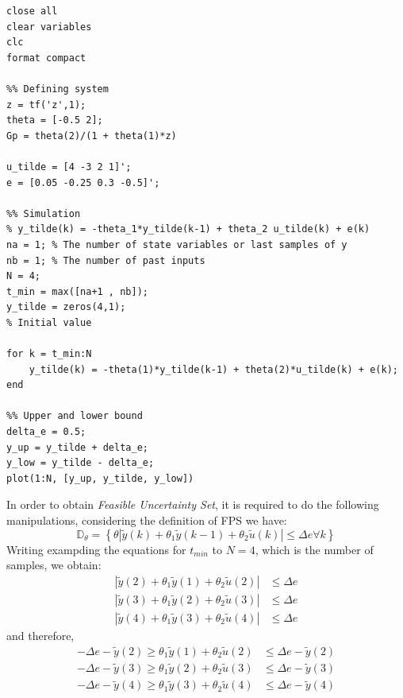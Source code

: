 \begin{example}
\begin{lstlisting}[caption=Set-membership estimation with theta bounds and simulation]
close all
clear variables
clc
format compact

%% Defining system
z = tf('z',1);
theta = [-0.5 2];
Gp = theta(2)/(1 + theta(1)*z)

u_tilde = [4 -3 2 1]';
e = [0.05 -0.25 0.3 -0.5]';

%% Simulation
% y_tilde(k) = -theta_1*y_tilde(k-1) + theta_2 u_tilde(k) + e(k)
na = 1; % The number of state variables or last samples of y
nb = 1; % The number of past inputs
N = 4;
t_min = max([na+1 , nb]);
y_tilde = zeros(4,1); 
% Initial value

for k = t_min:N
    y_tilde(k) = -theta(1)*y_tilde(k-1) + theta(2)*u_tilde(k) + e(k);
end

%% Upper and lower bound
delta_e = 0.5;
y_up = y_tilde + delta_e;
y_low = y_tilde - delta_e;
plot(1:N, [y_up, y_tilde, y_low])
\end{lstlisting}
\end{example}

In order to obtain \textit{Feasible Uncertainty Set}, it is required to do the following manipulations, considering the definition of FPS we have:
\[
\mathbb{D}_\theta = \left\{ \theta | \tilde{y}(k) + \theta_1 \tilde{y}(k-1) + \theta_2\tilde{u}(k)| \leq \Delta e \forall k \right\}  
\]
Writing exampding the equations for \(t_{min}\) to \(N = 4\), which is the number of samples, we obtain:
\begin{align*}
|\tilde{y}(2) + \theta_1 \tilde{y}(1) + \theta_2\tilde{u}(2)| &\leq \Delta e \\
|\tilde{y}(3) + \theta_1 \tilde{y}(2) + \theta_2\tilde{u}(3)| &\leq \Delta e \\
|\tilde{y}(4) + \theta_1 \tilde{y}(3) + \theta_2\tilde{u}(4)| &\leq \Delta e
\end{align*}
and therefore,
\begin{align*}
-\Delta e - \tilde{y}(2) \geq \theta_1 \tilde{y}(1) + \theta_2\tilde{u}(2) &\leq \Delta e - \tilde{y}(2) \\
-\Delta e - \tilde{y}(3) \geq \theta_1 \tilde{y}(2) + \theta_2\tilde{u}(3) &\leq \Delta e - \tilde{y}(3) \\-\Delta e - \tilde{y}(4) \geq \theta_1 \tilde{y}(3) + \theta_2\tilde{u}(4) &\leq \Delta e - \tilde{y}(4) 
\end{align*}

